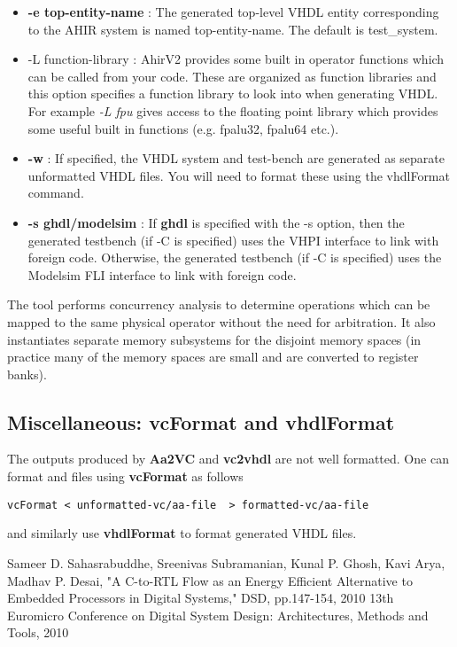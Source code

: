 \begin{itemize}
(an integer $\geq 1$),
the user can trade-off clock cycles versus clock period.  
The lowest clock period will be obtained for -S 1.   
\item {\bf -e top-entity-name} : The generated top-level VHDL entity
corresponding to the AHIR system is named top-entity-name.  The default
is test\_system.
\item {-L function-library} : AhirV2 provides some built in operator
functions which can be called from your code.  These are organized
as function libraries and this option specifies a function library
to look into when generating VHDL.  For example {\em -L fpu} gives
access to the floating point library which provides some useful
built in functions (e.g. fpalu32, fpalu64 etc.).
\item {\bf -w} :  If specified, the VHDL system and test-bench are
generated as separate unformatted VHDL files.  You will need to
format these using the vhdlFormat command.
\item {\bf -s ghdl/modelsim} :  If {\bf ghdl} is specified
with the -s option, then the generated testbench (if -C is specified)
uses the VHPI interface to link with foreign code.  Otherwise,
the generated testbench (if -C is specified) uses the Modelsim FLI
interface to link with foreign code.
\end{itemize}

The tool performs concurrency analysis to determine operations which
can be mapped to the same physical operator without the need for
arbitration.  It also instantiates separate memory subsystems for
the disjoint memory spaces (in practice many of the memory spaces
are small and are converted to register banks).

\subsection{Miscellaneous: {\bf vcFormat} and {\bf vhdlFormat}}

The outputs produced by {\bf Aa2VC} and {\bf vc2vhdl} are
not well formatted.  One can format \Aa and \vC files
using  {\bf vcFormat} as follows
\begin{verbatim}
vcFormat < unformatted-vc/aa-file  > formatted-vc/aa-file
\end{verbatim}
and similarly use {\bf vhdlFormat} to format generated
VHDL files.


\begin{thebibliography}{99}
Sameer D. Sahasrabuddhe, Sreenivas Subramanian, Kunal P. Ghosh, Kavi Arya, Madhav P. Desai, 
"A C-to-RTL Flow as an Energy Efficient Alternative to Embedded Processors in Digital Systems," 
DSD, pp.147-154, 2010 13th Euromicro Conference on Digital 
System Design: Architectures, Methods and Tools, 2010
\end{thebibliography}

